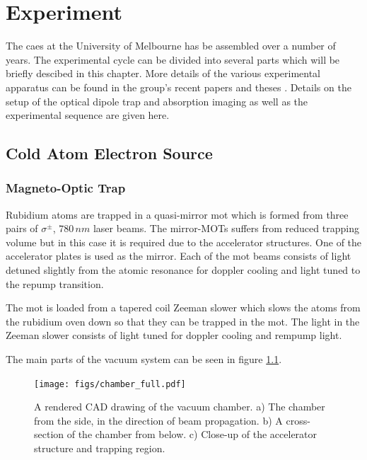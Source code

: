 \chapter{Experiment}

The \gls{caes} at the University of Melbourne has be assembled over a number of years. The experimental cycle can be divided into several parts which will be briefly descibed in this chapter. More details of the various experimental apparatus can be found in the group's recent papers \cite{bell_slow_2010, mcculloch_arbitrarily_2011, saliba_spatial_2012} and theses \cite{mcculloch_towards_2012, sheludko_shaped_2010, saliba_partially_2011}. Details on the setup of the optical dipole trap and absorption imaging as well as the experimental sequence are given here.

\section{Cold Atom Electron Source}
\subsection{Magneto-Optic Trap}
Rubidium atoms are trapped in a quasi-mirror \gls{mot} which is formed from three pairs of $\sigma^\pm$, $780\,\unit{nm}$ laser beams. The mirror-MOTs suffers from reduced trapping volume\cite{reichel_atomic_1999} but in this case it is required due to the accelerator structures. One of the accelerator plates is used as the mirror. Each of the \gls{mot} beams consists of light detuned slightly from the atomic resonance for doppler cooling and light tuned to the repump transition.

The \gls{mot} is loaded from a tapered coil Zeeman slower which slows the atoms from the rubidium oven down so that they can be trapped in the \gls{mot}. The light in the Zeeman slower consists of light tuned for doppler cooling and rempump light.

The main parts of the vacuum system can be seen in figure \ref{fig:app_complete_chamber}.

\begin{landscape}
\begin{figure}[p]
\centering
\texttt{[image: figs/chamber\_full.pdf]}
 \caption{A rendered CAD drawing of the vacuum chamber. a) The chamber from the side, in the direction of beam propagation. b) A cross-section of the chamber from below. c) Close-up of the accelerator structure and trapping region.}
\label{fig:app_complete_chamber}
\end{figure}
\end{landscape}

